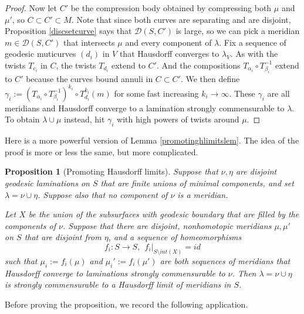 \documentclass[12pt]{amsart}
\newtheorem{prop}[theorem]{Proposition}
\theoremstyle{definition}
\theoremstyle{remark}
\begin{document}
\begin{proof}
Now let $C'$ be the compression body obtained by compressing both $\mu$ and $\mu'$, so $C \subset C' \subset M$. Note that since both curves are separating and are disjoint, Proposition \ref{discsetcurve} says that $\mathcal D(S,C')$ is large, so we can pick a meridian $m\in \mathcal D(S,C')$ that intersects $\mu$ and every component of $\lambda$. Fix a sequence of geodesic muticurves $(d_i)$ in $V$ that Hausdorff converges to $\lambda_{V}$. As with the twists $T_{c_i}$ in $C$, the twists $T_{d_i}$ extend to $C'$. And the compositions $T_{\alpha_i} \circ T_{\beta_i}^{-1}$ extend to $C'$ because the curves bound annuli in $C \subset C'$. We then define $\gamma_i:=(T_{\alpha_i}\circ T_{\beta_i}^{-1})^{k_i} \circ T_{d_i}^{k_i}(m)$ for some fast increasing $k_i\to \infty$. These $\gamma_i$ are all meridians and Hausdorff converge to a lamination strongly commensurable to $\lambda$. To obtain $\lambda\cup \mu$ instead, hit $\gamma_i$ with high powers of twists around $\mu$.
 \end{proof}


Here is a more powerful version of Lemma \ref{promotinghlimitslem}. The idea of the proof is more or less the same, but more complicated.

\begin{prop}[Promoting Hausdorff limits] \label{promotinghlimits}
 Suppose that $\nu,\eta$ are disjoint geodesic laminations on $S$ that are finite unions of minimal components, and set $\lambda=\nu\cup \eta$. Suppose also that no component of $\nu$ is a meridian.

Let $X$ be the union of the subsurfaces with geodesic boundary that are filled by the components of $\nu$. Suppose that there are disjoint, nonhomotopic meridians $\mu,\mu'$ on $S$ that are disjoint from $\eta$, and a sequence of homeomorphisms $$f_i : S \longrightarrow S, \ \ f_i|_{S \setminus int(X)}=id$$ such that $\mu_i:=f_i(\mu)$ and $\mu_i':=f_i(\mu')$ are both sequences of meridians that Hausdorff converge to laminations strongly commensurable to $\nu$. Then $\lambda=\nu \cup \eta$ is strongly commensurable to a Hausdorff limit of meridians in $S$.
\end{prop}
 
Before proving the proposition, we record the following application.
\end{document}
